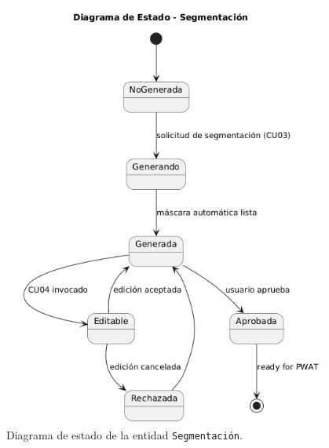 \begin{figure}[H]
  \centering
  \includegraphics[width=0.95\textwidth,height=0.5\textheight,keepaspectratio]{imagenes/estado_segmentacion.png}
  \caption{Diagrama de estado de la entidad \texttt{Segmentación}.}
  \label{fig:estado_segmentacion}
\end{figure}

